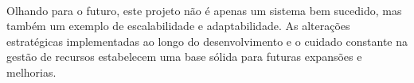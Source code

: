 \documentclass{article}
\begin{document}
\paragraph{}Olhando para o futuro, este projeto não é apenas um sistema bem sucedido, mas também um exemplo de escalabilidade e adaptabilidade. As alterações estratégicas implementadas ao longo do desenvolvimento e o cuidado constante na gestão de recursos estabelecem uma base sólida para futuras expansões e melhorias.
\end{document}
